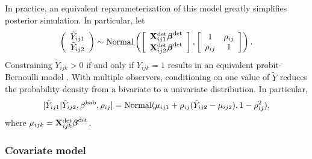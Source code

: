 \documentclass[10pt]{article}
\begin{document}
In practice, an equivalent reparameterization of this model greatly simplifies posterior simulation. In particular, let
\begin{equation} \label{eq:obs.mod}
\left(\begin{array}{c}
				\tilde{Y}_{ij1} \\
				\tilde{Y}_{ij2}
		\end{array}\right) \sim {\rm Normal}
\left( \left[ \begin{array}{c}
				{\bf X}_{ij1}^{\rm det} \boldsymbol{\beta}^{\rm det}\\
				{\bf X}_{ij2}^{\rm det} \boldsymbol{\beta}^{\rm det}
		\end{array}\right],
        \left[ \begin{array}{cc}
            1 & \rho_{ij} \\
            \rho_{ij} & 1
        \end{array} \right]
\right).
\end{equation}
Constraining $\tilde{Y}_{ijk}>0$ if and only if $Y_{ijk}=1$ results in an equivalent probit-Bernoulli model  \cite{AlbertChib1993}.
With multiple observers, conditioning on one value of $\tilde{Y}$ reduces the probability density from a bivariate to a univariate distribution.  In particular,
\begin{equation}
\label{eq:biv_to_univ}
[\tilde{Y}_{ij1} | \tilde{Y}_{ij2},\beta^{\rm hab},\rho_{ij}]={\rm Normal}(\mu_{ij1}+\rho_{ij}(\tilde{Y}_{ij2}-\mu_{ij2}),1-\rho_{ij}^2),
\end{equation}
where $\mu_{ijk}={\bf X}_{ijk}^{\rm det} \boldsymbol{\beta}^{\rm det}$.

\subsubsection*{Covariate model}
\end{document}
